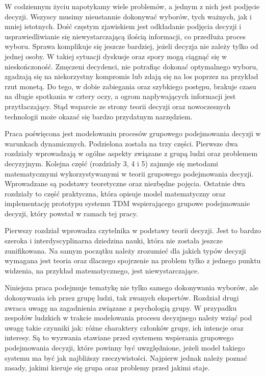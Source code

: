 W codziennym życiu napotykamy wiele problemów, a jednym z nich jest podjęcie
decyzji. Wszyscy musimy nieustannie dokonywać wyborów, tych ważnych, jak i mniej
istotnych. Dość częstym zjawiskiem jest odkładanie podjęcia decyzji i
usprawiedliwianie się niewystarczającą ilością informacji, co przedłuża proces
wyboru. Sprawa komplikuje się jeszcze bardziej, jeżeli decyzja nie zależy tylko
od jednej osoby. W takiej sytuacji dyskusje oraz spory mogą ciągnąć się w
nieskończoność. Zmęczeni decydenci, nie potrafiąc dokonać optymalnego wyboru,
zgadzają się na niekorzystny kompromis lub zdają się na los poprzez na
przykład rzut monetą. Do tego, w dobie zabiegania oraz szybkiego postępu,
brakuje czasu na długie spotkania w cztery oczy, a ogrom napływających
informacji jest przytłaczający. Stąd wsparcie ze strony teorii decyzji oraz
nowoczesnych technologii może okazać się bardzo przydatnym narzędziem.

Praca poświęcona jest modelowaniu procesów grupowego podejmowania decyzji w
warunkach dynamicznych. Podzielona została na trzy części. Pierwsze dwa
rozdziały wprowadzają w ogólne aspekty związane z grupą ludzi oraz problemem
decyzyjnym. Kolejna część (rozdziały 3, 4 i 5) zajmuje się metodami
matematycznymi wykorzystywanymi w teorii grupowego podejmowania decyzji.
Wprowadzane są podstawy teoretyczne oraz niezbędne pojęcia. Ostatnie dwa
rozdziały to część praktyczna, która opisuje model matematyczny oraz
implementację prototypu systemu TDM wspierającego grupowe podejmowanie decyzji,
który powstał w ramach tej pracy.

Pierwszy rozdział wprowadza czytelnika w podstawy teorii decyzji. Jest to bardzo
szeroka i interdyscyplinarna dziedzina nauki, która nie została jeszcze
zunifikowana. Na samym początku należy zrozumieć dla jakich typów decyzji
wymagana jest teoria oraz dlaczego spojrzenie na problem tylko z jednego punktu
widzenia, na przykład matematycznego, jest niewystarczające.

Niniejsza praca podejmuje tematykę nie tylko samego dokonywania wyborów, ale
dokonywania ich przez grupę ludzi, tak zwanych ekspertów. Rozdział drugi zwraca
uwagę na zagadnienia związane z psychologią grupy. W przypadku zespołów
ludzkich w trakcie modelowania procesu decyzjnego należy wziąć pod uwagę takie
czynniki jak: różne charaktery członków grupy, ich intencje oraz interesy. Są to
wyzwania stawiane przed systemem wspierania grupowego podejmowania decyzji,
które powinny być uwzględnione, jeżeli model takiego systemu ma być jak
najbliższy rzeczywistości. Najpierw jednak należy poznać zasady, jakimi kieruje
się grupa oraz problemy przed jakimi staje.

